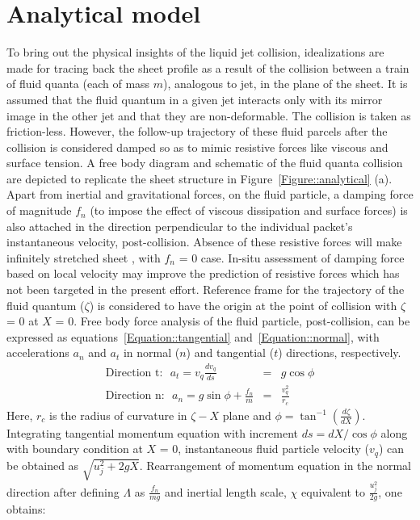 \section{Analytical model}
To bring out the physical insights of the liquid jet collision, idealizations are made for tracing back the sheet profile as a result of the collision between a train of fluid quanta (each of mass $m$), analogous to jet, in the plane of the sheet. It is assumed that the fluid quantum in a given jet interacts only with its mirror image in the other jet and that they are non-deformable. The collision is taken as friction-less. However, the follow-up trajectory of these fluid parcels after the collision is considered damped so as to mimic resistive forces like viscous and surface tension. A free body diagram and schematic of the fluid quanta collision are depicted to replicate the sheet structure in Figure~\ref{Figure::analytical} (a). Apart from inertial and gravitational forces, on the fluid particle, a damping force of magnitude $f_n$ (to impose the effect of viscous dissipation and surface forces) is also attached in the direction perpendicular to the individual packet's instantaneous velocity, post-collision. Absence of these resistive forces will make infinitely stretched sheet \citep{taylor1960formation}, with $f_n$ = 0 case. In-situ assessment of damping force based on local velocity may improve the prediction of resistive forces which has not been targeted in the present effort. Reference frame for the trajectory of the fluid quantum ($\zeta$) is considered to have the origin at the point of collision with $\zeta$ = 0 at $X$ = 0. Free body force analysis of the fluid particle, post-collision, can be expressed as equations~\ref{Equation::tangential} and~\ref{Equation::normal}, with accelerations $a_n$ and $a_t$ in normal ($n$) and tangential ($t$) directions, respectively.
\begin{subequations}%
    \label{Equation::forceBal}    
    \begin{eqnarray}
    \label{Equation::tangential}
    \text{Direction t:}\:\:\: a_t = v_{q}\frac{dv_{q}}{ds} &=& g\cos\phi\\
    \label{Equation::normal}
    \text{Direction n:}\:\:\: a_n = g\sin\phi + \frac{f_n}{m} &=& \frac{v_{q}^2}{r_c}
    \end{eqnarray}
\end{subequations}
Here, $r_c$ is the radius of curvature in $\zeta-X$ plane and $\phi = \tan^{-1}\left(\frac{d\zeta}{dX}\right)$. Integrating tangential momentum equation with increment $ds = dX/\cos\phi$ along with boundary condition at $X$ = 0, instantaneous fluid particle velocity ($v_{q}$) can be obtained as $\sqrt{u_j^2 + 2gX}$. Rearrangement of momentum equation in the normal direction after defining $\Lambda$ as $\frac{f_n}{mg}$ and inertial length scale, $\chi$ equivalent to $\frac{u_j^2}{2g}$, one obtains:
